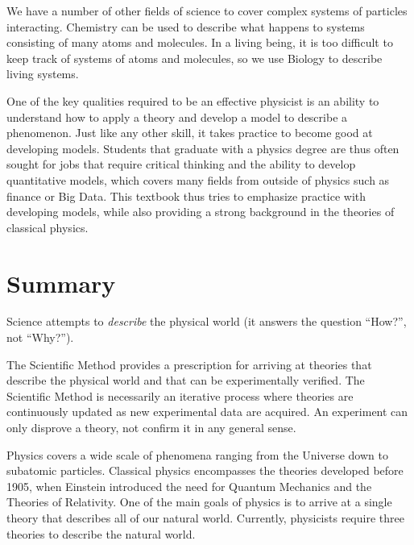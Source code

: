 We have a number of other fields of science to cover complex systems of particles interacting. Chemistry can be used to describe what happens to systems consisting of many atoms and molecules. In a living being, it is too difficult to keep track of systems of atoms and molecules, so we use Biology to describe living systems. 

One of the key qualities required to be an effective physicist is an ability to understand how to apply a theory and develop a model to describe a phenomenon. Just like any other skill, it takes practice to become good at developing models. Students that graduate with a physics degree are thus often sought for jobs that require critical thinking and the ability to develop quantitative models, which covers many fields from outside of physics such as finance or Big Data. This textbook thus tries to emphasize practice with developing models, while also providing a strong background in the theories of classical physics. 

\newpage
\section{Summary}
\vspace{0.5cm}
\begin{chapterSummary}
Science attempts to \textit{describe} the physical world (it answers the question ``How?'', not ``Why?''). 

The Scientific Method provides a prescription for arriving at theories that describe the physical world and that can be experimentally verified. The Scientific Method is necessarily an iterative process where theories are continuously updated as new experimental data are acquired. An experiment can only disprove a theory, not confirm it in any general sense.

Physics covers a wide scale of phenomena ranging from the Universe down to subatomic particles. Classical physics encompasses the theories developed before 1905, when Einstein introduced the need for Quantum Mechanics and the Theories of Relativity. One of the main goals of physics is to arrive at a single theory that describes all of our natural world. Currently, physicists require three theories to describe the natural world.

\end{chapterSummary}

